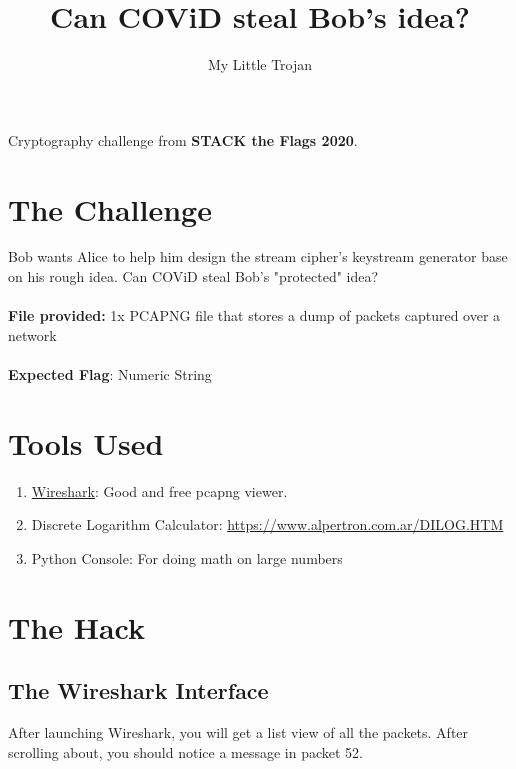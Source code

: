 \documentclass{article}
\title{Can COViD steal Bob's idea?}
\author{My Little Trojan}
\begin{document}
	\maketitle
	\noindent
	Cryptography challenge from \textbf{STACK the Flags 2020}.\\
	
	\section{The Challenge}
	Bob wants Alice to help him design the stream cipher's keystream generator base on his rough idea. Can COViD steal Bob's "protected" idea?\\
	\\
	\textbf{File provided:} 1x PCAPNG file that stores a dump of packets captured over a network\\
	\\
	\textbf{Expected Flag}: Numeric String
	
	\section{Tools Used}
	\begin{enumerate}
		\item 
		\href{https://www.wireshark.org/download.html}{Wireshark}: Good and free pcapng viewer.
		\item
		Discrete Logarithm Calculator: \url{https://www.alpertron.com.ar/DILOG.HTM}
		\item
		Python Console: For doing math on large numbers
	\end{enumerate}
	
	\section{The Hack}
	\subsection{The Wireshark Interface}
	After launching Wireshark, you will get a list view of all the packets. After scrolling about, you should notice a message in packet 52.
	
\end{document}
